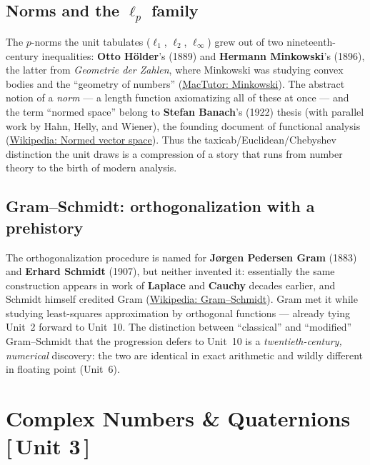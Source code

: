 \documentclass[11pt]{article}
\newcommand{\who}[1]{{\sffamily\bfseries #1}}
\newcommand{\yr}[1]{{\sffamily\color{BrickRed}(#1)}}
\newcommand{\unit}[1]{{\footnotesize\sffamily\color{RoyalBlue}[\,#1\,]}}
\begin{document}
\subsection{Norms and the $\ell_p$ family}
The $p$-norms the unit tabulates ($\ell_1$, $\ell_2$, $\ell_\infty$) grew out of
two nineteenth-century inequalities: \who{Otto H\"older}'s \yr{1889} and
\who{Hermann Minkowski}'s \yr{1896}, the latter from \emph{Geometrie der Zahlen},
where Minkowski was studying convex bodies and the ``geometry of numbers''
(\href{https://mathshistory.st-andrews.ac.uk/Biographies/Minkowski/}{MacTutor:
Minkowski}). The abstract notion of a \emph{norm} --- a length function
axiomatizing all of these at once --- and the term ``normed space'' belong to
\who{Stefan Banach}'s \yr{1922} thesis (with parallel work by Hahn, Helly, and
Wiener), the founding document of functional analysis
(\href{https://en.wikipedia.org/wiki/Normed_vector_space\#History}{Wikipedia:
Normed vector space}). Thus the taxicab/Euclidean/Chebyshev distinction the unit
draws is a compression of a story that runs from number theory to the birth of
modern analysis.

\subsection{Gram--Schmidt: orthogonalization with a prehistory}
The orthogonalization procedure is named for \who{J\o rgen Pedersen Gram}
\yr{1883} and \who{Erhard Schmidt} \yr{1907}, but neither invented it: essentially
the same construction appears in work of \who{Laplace} and \who{Cauchy} decades
earlier, and Schmidt himself credited Gram
(\href{https://en.wikipedia.org/wiki/Gram\%E2\%80\%93Schmidt_process\#History}{Wikipedia:
Gram--Schmidt}). Gram met it while studying least-squares approximation by
orthogonal functions --- already tying Unit~2 forward to Unit~10. The distinction
between ``classical'' and ``modified'' Gram--Schmidt that the progression defers to
Unit~10 is a \emph{twentieth-century, numerical} discovery: the two are identical
in exact arithmetic and wildly different in floating point (Unit~6).

\section{Complex Numbers \& Quaternions \unit{Unit 3}}
\end{document}
